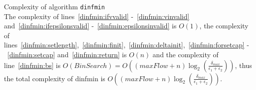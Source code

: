 \begin{sepproof}{Complexity of algorithm \texttt{dinfmin}} \ \\
  The complexity of lines~\ref{dinfmin:ifvvalid} -~\ref{dinfmin:vinvalid} and~\ref{dinfmin:ifepsilonsvalid}
  -~\ref{dinfmin:epsilonsinvalid} is $O\left(1\right)$, the complexity of
  lines~\ref{dinfmin:setlength},~\ref{dinfmin:finit},~\ref{dinfmin:deltainit},~\ref{dinfmin:forsetcap}
  -~\ref{dinfmin:setcap} and~\ref{dinfmin:return} is $O\left(n\right)$ and the complexity of line~\ref{dinfmin:bs} is
  $O\left(BinSearch\right) = O\left(\left(maxFlow + n\right) \log_2\left(\frac{\delta_{max}}{\epsilon_1 +
  \epsilon_2}\right)\right)$, thus the total complexity of dinfmin is $O\left(\left(maxFlow +
  n\right)\log_2\left(\frac{\delta_{max}}{\epsilon_1 + \epsilon_2}\right)\right)$.
\end{sepproof}
